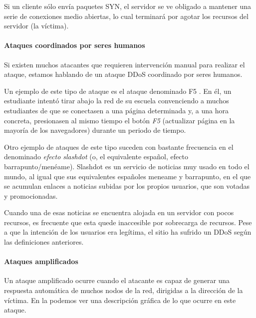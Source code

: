 Si un cliente sólo envía paquetes SYN, el servidor se ve obligado a mantener una serie de conexiones medio abiertas, lo 
cual terminará por agotar los recursos del servidor (la víctima).

\paragraph{Ataques coordinados por seres humanos}\mbox{\newline}

\noindent Si existen muchos atacantes que requieren intervención manual para realizar el ataque, estamos hablando de un 
ataque DDoS coordinado por seres humanos. 

Un ejemplo de este tipo de ataque es el ataque denominado F5 \cite{F5_attack}. En él, un estudiante 
intentó tirar abajo la red de su escuela convenciendo a muchos estudiantes de que se conectasen a una página determinada 
y, a una hora concreta, presionasen al mismo tiempo el botón \emph{F5} (actualizar página en la mayoría de los 
navegadores) durante un periodo de tiempo.

Otro ejemplo de ataques de este tipo suceden con bastante frecuencia en el denominado \emph{efecto 
slashdot} (o, el equivalente español, efecto 
barrapunto/menéame). Slashdot es un servicio de noticias muy usado en todo el mundo, al igual que sus equivalentes 
españoles meneame y barrapunto, en el que se acumulan enlaces a noticias subidas por los propios usuarios, que son 
votadas y promocionadas.

Cuando una de esas noticias se encuentra alojada en un servidor con pocos recursos, es frecuente que esta quede 
inaccesible por sobrecarga de recursos. Pese a que la intención de los usuarios era legítima, el sitio ha sufrido un 
\gls{DDoS} según las definiciones anteriores.

\paragraph{Ataques amplificados}\mbox{\newline} 

\noindent Un ataque amplificado ocurre cuando el atacante es capaz de generar una respuesta automática de muchos nodos 
de la red, dirigidas a la dirección de la víctima. En la  podemos ver una descripción gráfica de lo 
que ocurre en este ataque.

